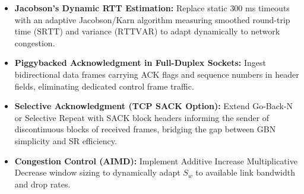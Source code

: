 \documentclass[11pt,a4paper]{article}
\begin{document}
\begin{commentbox}
\begin{itemize}[leftmargin=1.2em]
    \item \textbf{Jacobson's Dynamic RTT Estimation:} Replace static $300$ ms timeouts with an adaptive Jacobson/Karn algorithm measuring smoothed round-trip time ($\text{SRTT}$) and variance ($\text{RTTVAR}$) to adapt dynamically to network congestion.
    \item \textbf{Piggybacked Acknowledgment in Full-Duplex Sockets:} Ingest bidirectional data frames carrying ACK flags and sequence numbers in header fields, eliminating dedicated control frame traffic.
    \item \textbf{Selective Acknowledgment (TCP SACK Option):} Extend Go-Back-N or Selective Repeat with SACK block headers informing the sender of discontinuous blocks of received frames, bridging the gap between GBN simplicity and SR efficiency.
    \item \textbf{Congestion Control (AIMD):} Implement Additive Increase Multiplicative Decrease window sizing to dynamically adapt $S_w$ to available link bandwidth and drop rates.
\end{itemize}
\end{commentbox}
\end{document}
